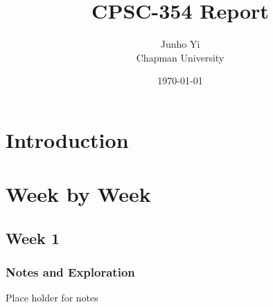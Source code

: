 \documentclass{article}
\title{CPSC-354 Report}
\author{Junho Yi  \\ Chapman University}
\date{\today}
\theoremstyle{theorem}
\theoremstyle{definition}
\theoremstyle{remark}
\begin{document}
\maketitle

\begin{abstract}
\end{abstract}

\setcounter{tocdepth}{3}
\tableofcontents

\section{Introduction}\label{intro}

\section{Week by Week}\label{homework}

\subsection{Week 1}

\subsubsection{Notes and Exploration}

Place holder for notes
\end{document}
